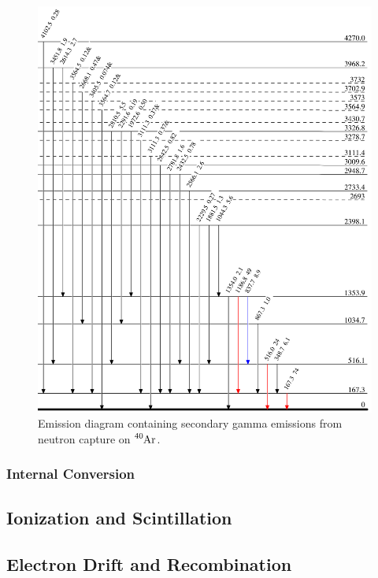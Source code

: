 \documentclass[8pt]{refart}
\begin{document}
\begin{figure}[H]
    \centering
    \includegraphics[width=\linewidth]{graphics/gamma_cascade_secondary.png}
    \caption{Emission diagram containing secondary gamma emissions from neutron capture on $\ce{^{40}Ar}$.}
    \label{fig:my_label}
\end{figure}

\subsubsection{Internal Conversion}

\subsection{Ionization and Scintillation}


\subsection{Electron Drift and Recombination}

\newpage
\end{document}
